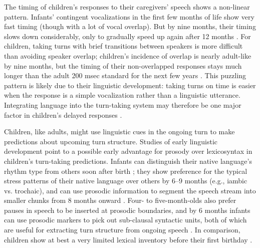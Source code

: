 \documentclass[authoryear, 12pt]{elsarticle}
\begin{document}

The timing of children's responses to their caregivers' speech shows a non-linear pattern. Infants' contingent vocalizations in the first few months of life show very fast timing (though with a lot of vocal overlap). But by nine months, their timing slows down considerably, only to gradually speed up again after 12 months \citep{hilbrink2015}. For children, taking turns with brief transitions between speakers is more difficult than avoiding speaker overlap; children's incidence of overlap is nearly adult-like by nine months, but the timing of their non-overlapped responses stays much longer than the adult 200 msec standard for the next few years \citep{casillas2016, garvey1984, garvey1981, ervin-tripp1979}. This puzzling pattern is likely due to their linguistic development: taking turns on time is easier when the response is a simple vocalization rather than a linguistic utterance. Integrating language into the turn-taking system may therefore be one major factor in children's delayed responses \citep{casillas2016}.

Children, like adults, might use linguistic cues in the ongoing turn to make predictions about upcoming turn structure. Studies of early linguistic development point to a possible early advantage for prosody over lexicosyntax in children's turn-taking predictions. Infants can distinguish their native language's rhythm type from others soon after birth \citep{mehler1988, nazzi2003}; they show preference for the typical stress patterns of their native language over others by 6--9 months (e.g., iambic vs. trochaic), and can use prosodic information to segment the speech stream into smaller chunks from 8 months onward \citep{johnson2001, morgan1995}. Four- to five-month-olds also prefer pauses in speech to be inserted at prosodic boundaries, and by 6 months infants can use prosodic markers to pick out sub-clausal syntactic units, both of which are useful for extracting turn structure from ongoing speech \citep{jusczyk1995, soderstrom2003}. In comparison, children show at best a very limited lexical inventory before their first birthday \citep{bergelson2013, shi2010}.
\end{document}
